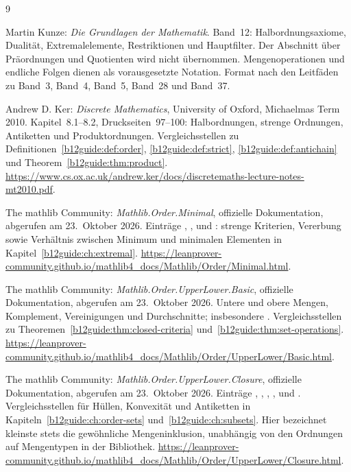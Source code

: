 \renewcommand{\bibname}{Quellen und Bandzuordnung}
\begin{thebibliography}{9}
\footnotesize
\setlength{\itemsep}{5pt}
\setlength{\parskip}{0pt}

Martin Kunze: \emph{Die Grundlagen der Mathematik}.
Band~12: Halbordnungsaxiome, Dualität, Extremalelemente,
Restriktionen und Hauptfilter. Der Abschnitt über Präordnungen
und Quotienten wird nicht übernommen.
Mengenoperationen und endliche Folgen dienen als vorausgesetzte
Notation. Format nach den Leitfäden zu Band~3, Band~4, Band~5,
Band~28 und Band~37.

Andrew D. Ker: \emph{Discrete Mathematics}, University of Oxford,
Michaelmas Term 2010. Kapitel~8.1--8.2, Druckseiten~97--100:
Halbordnungen, strenge Ordnungen, Antiketten und Produktordnungen.
Vergleichsstellen zu Definitionen~\ref{b12guide:def:order},
\ref{b12guide:def:strict}, \ref{b12guide:def:antichain}
und Theorem~\ref{b12guide:thm:product}.
\url{https://www.cs.ox.ac.uk/andrew.ker/docs/discretemaths-lecture-notes-mt2010.pdf}.

The mathlib Community: \emph{Mathlib.Order.Minimal},
offizielle Dokumentation, abgerufen am 23.~Oktober 2026.
Einträge , ,
 und :
strenge Kriterien, Vererbung sowie Verhältnis zwischen Minimum
und minimalen Elementen in Kapitel~\ref{b12guide:ch:extremal}.
\url{https://leanprover-community.github.io/mathlib4_docs/Mathlib/Order/Minimal.html}.

The mathlib Community: \emph{Mathlib.Order.UpperLower.Basic},
offizielle Dokumentation, abgerufen am 23.~Oktober 2026.
Untere und obere Mengen, Komplement, Vereinigungen und Durchschnitte;
insbesondere .
Vergleichsstellen zu Theoremen~\ref{b12guide:thm:closed-criteria}
und~\ref{b12guide:thm:set-operations}.
\url{https://leanprover-community.github.io/mathlib4_docs/Mathlib/Order/UpperLower/Basic.html}.

The mathlib Community: \emph{Mathlib.Order.UpperLower.Closure},
offizielle Dokumentation, abgerufen am 23.~Oktober 2026.
Einträge , ,
, ,
 und
.
Vergleichsstellen für Hüllen, Konvexität und Antiketten in
Kapiteln~\ref{b12guide:ch:order-sets} und~\ref{b12guide:ch:subsets}.
Hier bezeichnet \glqq kleinste\grqq{} stets die gewöhnliche
Mengeninklusion, unabhängig von den Ordnungen auf Mengentypen
in der Bibliothek.
\url{https://leanprover-community.github.io/mathlib4_docs/Mathlib/Order/UpperLower/Closure.html}.

\end{thebibliography}

